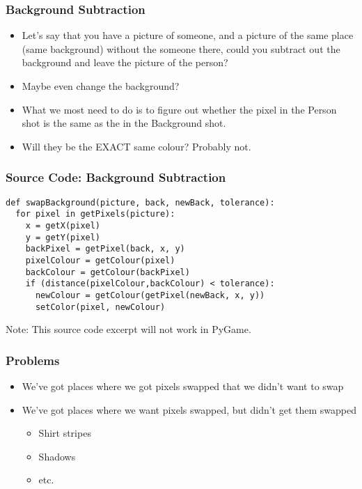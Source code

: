 \begin{frame}
	\frametitle{Background Subtraction}
	
	\begin{itemize}		
		\item Let's say that you have a picture of someone, and a picture of the same place (same background) without the someone there,
		could you subtract out the background and leave the picture of the person?
		\item Maybe even change the background?
		\item What we most need to do is to figure out whether the pixel in the Person shot is the same as the in the Background shot.
		\item Will they be the EXACT same colour?  Probably not.
	\end{itemize}
\end{frame}

\begin{frame}[fragile]
	\frametitle{Source Code: Background Subtraction}
	
\begin{lstlisting}
def swapBackground(picture, back, newBack, tolerance):
  for pixel in getPixels(picture):
    x = getX(pixel)
    y = getY(pixel)
    backPixel = getPixel(back, x, y)
    pixelColour = getColour(pixel)
    backColour = getColour(backPixel)
    if (distance(pixelColour,backColour) < tolerance):
      newColour = getColour(getPixel(newBack, x, y))
      setColor(pixel, newColour)
\end{lstlisting}

Note: This source code excerpt will not work in PyGame.

\end{frame}



\begin{frame}
	\frametitle{Problems}
	
	\begin{itemize}		
		\item We've got places where we got pixels swapped that we didn't want to swap
		\item We've got places where we want pixels swapped, but didn't get them swapped
		\begin{itemize}
			\item Shirt stripes
			\item Shadows
			\item etc.
		\end{itemize}	
	\end{itemize}
\end{frame}

